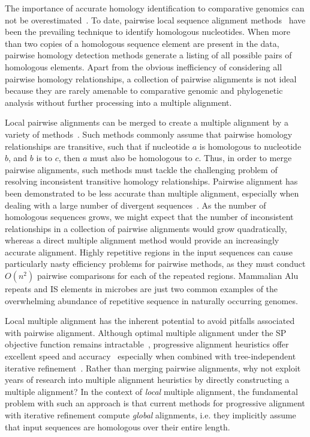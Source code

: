 \documentclass[twoside,11pt]{article}
\begin{document}
The importance of accurate homology identification to comparative genomics can not be overestimated~\cite{Kumar07}. To date, pairwise local sequence alignment methods~\cite{ref-blast, ref-ssearch} have been the prevailing technique to identify homologous nucleotides.  When more than two copies of a homologous sequence element are present in the data, pairwise homology detection methods generate a listing of all possible pairs of homologous elements.  Apart from the obvious inefficiency of considering all pairwise homology relationships, a collection of pairwise alignments is not ideal because they are rarely amenable to comparative genomic and phylogenetic analysis without further processing into a multiple alignment.

Local pairwise alignments can be merged to create a multiple alignment by a variety of methods~\cite{ref-tba,ref-aba,ref-dialign,ref-related1}. Such methods commonly assume that pairwise homology relationships are transitive, such that if nucleotide $a$ is homologous to nucleotide $b$, and $b$ is to $c$, then $a$ must also be homologous to $c$.  Thus, in order to merge pairwise alignments, such methods must tackle the challenging problem of resolving inconsistent transitive homology relationships.  Pairwise alignment has been demonstrated to be less accurate than multiple alignment, especially when dealing with a large number of divergent sequences~\cite{ref-mlagan,ref-aubergene}.  As the number of homologous sequences grows, we might expect that the number of inconsistent relationships in a collection of pairwise alignments would grow quadratically, whereas a direct multiple alignment method would provide an increasingly accurate alignment.  Highly repetitive regions in the input sequences can cause particularly nasty efficiency problems for pairwise methods, as they must conduct $O(n^{2})$ pairwise comparisons for each of the repeated regions.  Mammalian Alu repeats and IS elements in microbes are just two common examples of the overwhelming abundance of repetitive sequence in naturally occurring genomes.

Local multiple alignment has the inherent potential to avoid pitfalls associated with pairwise alignment. Although optimal multiple alignment under the SP objective function remains intractable~\cite{ref-wangjiang}, progressive alignment heuristics offer excellent speed and accuracy~\cite{ref-clustalw, ref-tcoffee} especially when combined with tree-independent iterative refinement~\cite{ref-muscle}. Rather than merging pairwise alignments, why not exploit years of research into multiple alignment heuristics by directly constructing a multiple alignment?   In the context of \textit{local} multiple alignment, the fundamental problem with such an approach is that current methods for progressive alignment with iterative refinement compute \textit{global} alignments, i.e. they implicitly assume that input sequences are homologous over their entire length.
\end{document}
